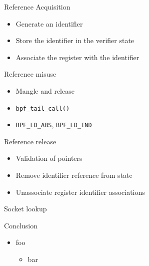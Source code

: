 \documentclass[black,white]{beamer}
\begin{document}
    \begin{frame}{Reference Acquisition}
        \begin{itemize}
            \item Generate an identifier \medskip
            \item Store the identifier in the verifier state \medskip
            \item Associate the register with the identifier \medskip
        \end{itemize}
    \end{frame}

    \begin{frame}[fragile]{Reference misuse}
        \begin{itemize}
            \item Mangle and release \medskip
            \item \verb+bpf_tail_call()+ \medskip
            \item \verb+BPF_LD_ABS+, \verb+BPF_LD_IND+ \medskip
        \end{itemize}
    \end{frame}

    \begin{frame}{Reference release}
        \begin{itemize}
            \item Validation of pointers \medskip
            \item Remove identifier reference from state \medskip
            \item Unassociate register identifier associations \medskip
        \end{itemize}
    \end{frame}

    \begin{frame}[fragile]{Socket lookup}
        
    \end{frame}

    \begin{frame}{Conclusion}
        \begin{itemize}
            \item foo \smallskip
            \begin{itemize}
                \item bar \medskip
            \end{itemize}
        \end{itemize}
    \end{frame}
\end{document}
